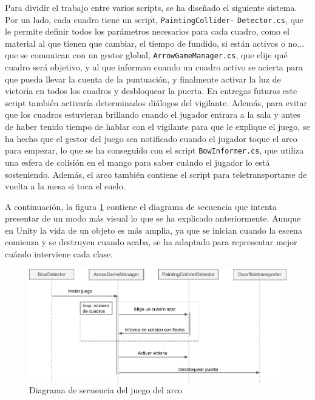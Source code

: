 Para dividir el trabajo entre varios scripts, se ha diseñado el siguiente sistema. Por un lado, cada cuadro tiene un script, \texttt{PaintingCollider-} \texttt{Detector.cs}, que le permite definir todos los parámetros necesarios para cada cuadro, como el material al que tienen que cambiar, el tiempo de fundido, si están activos o no... que se comunican con un gestor global, \texttt{ArrowGameManager.cs}, que elije qué cuadro será objetivo, y al que informan cuando un cuadro activo se acierta para que pueda llevar la cuenta de la puntuación, y finalmente activar la luz de victoria en todos los cuadros y desbloquear la puerta. En entregas futuras este script también activaría determinados diálogos del vigilante. Además, para evitar que los cuadros estuvieran brillando cuando el jugador entrara a la sala y antes de haber tenido tiempo de hablar con el vigilante para que le explique el juego, se ha hecho que el gestor del juego sea notificado cuando el jugador toque el arco para empezar, lo que se ha conseguido con el script \texttt{BowInformer.cs}, que utiliza una esfera de colisión en el mango para saber cuándo el jugador lo está sosteniendo. Además, el arco también contiene el script para teletransportarse de vuelta a la mesa si toca el suelo.

A continuación, la figura \ref{fig:sequence-diagram-bow} contiene el diagrama de secuencia que intenta presentar de un modo más visual lo que se ha explicado anteriormente. Aunque en Unity la vida de un objeto es más amplia, ya que se inician cuando la escena comienza y se destruyen cuando acaba, se ha adaptado para representar mejor cuándo interviene cada clase.

\begin{figure}[!h]
\begin{center}
\includegraphics[width=1\textwidth]{imagenes/7/bow-sequence-diagram.png}
\caption{Diagrama de secuencia del juego del arco}
\label{fig:sequence-diagram-bow}
\end{center}
\end{figure}

